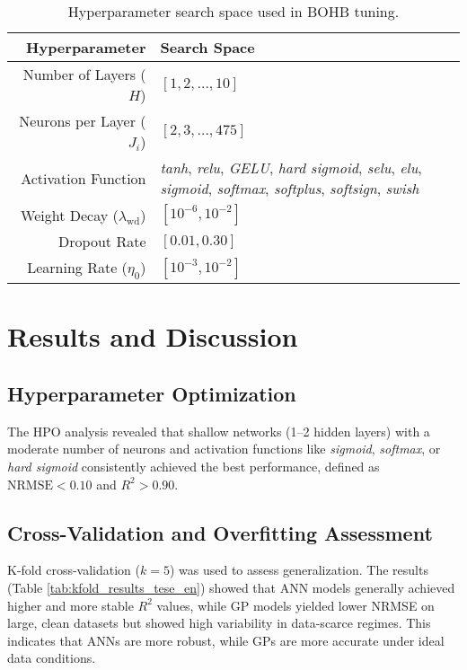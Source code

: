 \documentclass[dscexam, EN]{ufabcFHZh}
\begin{document}
\begin{table}[h!]
  \caption{Hyperparameter search space used in BOHB tuning.}
  \label{tab:hpo_search_tese_en}
  \centering
  \begin{tabularx}{\linewidth}{r X}
  \toprule
  \textbf{Hyperparameter} & \textbf{Search Space} \\
  \midrule
  Number of Layers ($H$) & $[1, 2, \dots, 10]$ \\
  Neurons per Layer ($J_i$) & $[2, 3, \dots, 475]$ \\
  Activation Function & \textit{tanh}, \textit{relu}, \textit{GELU}, \textit{hard sigmoid}, \textit{selu}, \textit{elu}, \textit{sigmoid}, \textit{softmax}, \textit{softplus}, \textit{softsign}, \textit{swish} \\
  Weight Decay ($\lambda_{\text{wd}}$) & $[10^{-6}, 10^{-2}]$ \\
  Dropout Rate & $[0.01, 0.30]$ \\
  Learning Rate ($\eta_0$) & $[10^{-3}, 10^{-2}]$ \\
  \bottomrule
  \end{tabularx}
\end{table}


\chapter{Results and Discussion}

\section{Hyperparameter Optimization}
The HPO analysis revealed that shallow networks (1–2 hidden layers) with a moderate number of neurons and activation functions like \textit{sigmoid}, \textit{softmax}, or \textit{hard sigmoid} consistently achieved the best performance, defined as $\text{NRMSE} < 0.10$ and $R^2 > 0.90$.

\section{Cross-Validation and Overfitting Assessment}
K-fold cross-validation ($k=5$) was used to assess generalization. The results (Table \ref{tab:kfold_results_tese_en}) showed that ANN models generally achieved higher and more stable $R^2$ values, while GP models yielded lower NRMSE on large, clean datasets but showed high variability in data-scarce regimes. This indicates that ANNs are more robust, while GPs are more accurate under ideal data conditions.
\end{document}
